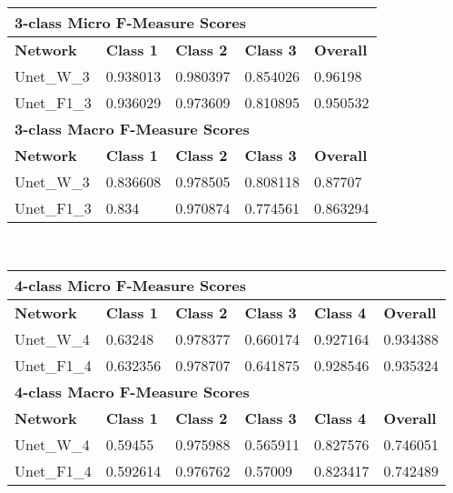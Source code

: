 \begin {table}
	\begin{flushleft}
		\begin {tabular}[!ht]{|l|l|l|l|l|}
			\hline\multicolumn{5}{|l|}{\textbf{3-class Micro F-Measure Scores}} \\ \hline
			\textbf{Network}& \textbf{Class 1}& \textbf{Class 2}& \textbf{Class 3}& \textbf{Overall} \\ \hline
			Unet\_W\_3& \cellcolor{green!25}0.938013& \cellcolor{green!25}0.980397& \cellcolor{green!25}0.854026& \cellcolor{green!25}0.96198 \\ \hline
			Unet\_F1\_3& 0.936029& 0.973609& 0.810895&  0.950532\\ \hline
			\multicolumn{5}{|l|}{\textbf{3-class Macro F-Measure Scores}} \\ \hline
			\textbf{Network}& \textbf{Class 1}& \textbf{Class 2}& \textbf{Class 3}& \textbf{Overall} \\ \hline
			Unet\_W\_3& \cellcolor{green!25}0.836608& \cellcolor{green!25}0.978505& \cellcolor{green!25}0.808118& \cellcolor{green!25}0.87707 \\ \hline
			Unet\_F1\_3& 0.834&  0.970874& 0.774561& 0.863294 \\ \hline
		\end {tabular}
		\vspace{0.5cm}\\
		\begin {tabular}[!ht]{|l|l|l|l|l|l|}
			\hline\multicolumn{6}{|l|}{\textbf{4-class Micro F-Measure Scores}} \\ \hline
			\textbf{Network}& \textbf{Class 1}& \textbf{Class 2}& \textbf{Class 3}& \textbf{Class 4}& \textbf{Overall} \\ \hline
			Unet\_W\_4& \cellcolor{green!25}0.63248& 0.978377& \cellcolor{green!25}0.660174& 0.927164& 0.934388 \\ \hline
			Unet\_F1\_4& 0.632356& \cellcolor{green!25}0.978707& 0.641875& \cellcolor{green!25}0.928546& \cellcolor{green!25}0.935324 \\ \hline
			\multicolumn{6}{|l|}{\textbf{4-class Macro F-Measure Scores}} \\ \hline
			\textbf{Network}& \textbf{Class 1}& \textbf{Class 2}& \textbf{Class 3}& \textbf{Class 4}& \textbf{Overall} \\ \hline
			Unet\_W\_4& \cellcolor{green!25}0.59455& 0.975988& 0.565911& \cellcolor{green!25}0.827576& \cellcolor{green!25}0.746051 \\ \hline
			Unet\_F1\_4& 0.592614& \cellcolor{green!25}0.976762& \cellcolor{green!25}0.57009& 0.823417& 0.742489 \\ \hline
		\end {tabular}
	\end {flushleft}


\end{table}
